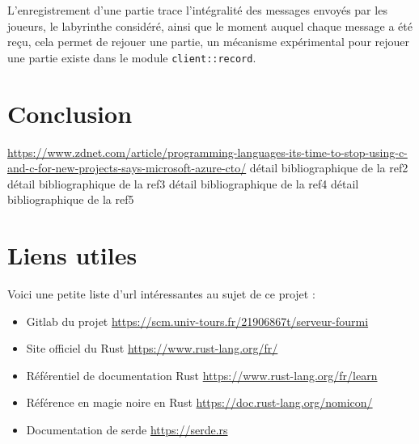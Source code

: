 \documentclass{EPUProjetDi}
\begin{document}
L'enregistrement d'une partie trace l'intégralité des messages envoyés par les joueurs, le labyrinthe considéré, ainsi que le moment auquel chaque message a été reçu, cela permet de rejouer une partie, un mécanisme expérimental pour rejouer une partie existe dans le module \verb|client::record|.

\chapter*{Conclusion}

\label{sec:conclusion}

\begin{thebibliography}{99}
\label{sec:biblio}
  \url{https://www.zdnet.com/article/programming-languages-its-time-to-stop-using-c-and-c-for-new-projects-says-microsoft-azure-cto/}
  détail bibliographique de la ref2
  détail bibliographique de la ref3
  détail bibliographique de la ref4
  détail bibliographique de la ref5
\end{thebibliography}


\appendix
{}


\chapter{Liens utiles\label{sec:liens_utiles}}
Voici une petite liste d'url intéressantes au sujet de ce projet :

\begin{itemize}
\item Gitlab du projet \url{https://scm.univ-tours.fr/21906867t/serveur-fourmi}
\item Site officiel du Rust \url{https://www.rust-lang.org/fr/}
\item Référentiel de documentation Rust \url{https://www.rust-lang.org/fr/learn}
\item Référence en magie noire en Rust \url{https://doc.rust-lang.org/nomicon/}
\item Documentation de serde \url{https://serde.rs}
\end{itemize}
\end{document}
